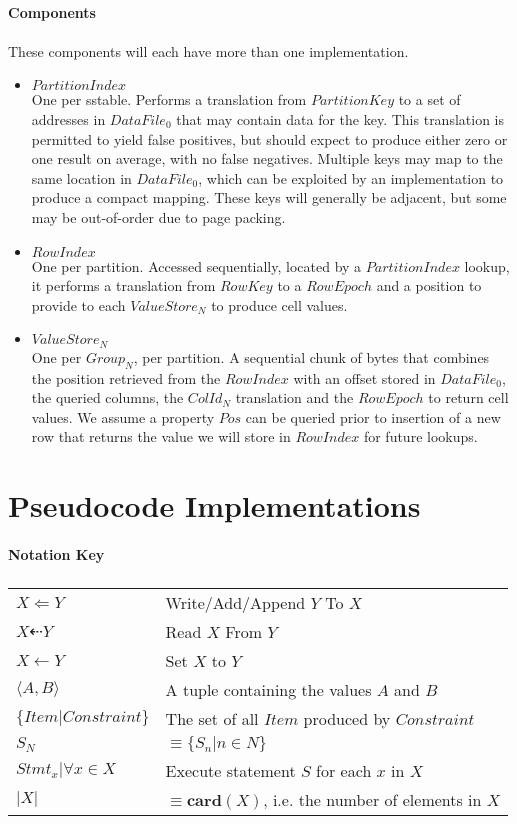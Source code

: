 \documentclass[fleqn]{article}
\begin{document}
\paragraph{Components}
\paragraph{}
These components will each have more than one implementation.
\begin{itemize}
  \item $PartitionIndex$\\[2pt]
    One per sstable.
    Performs a translation from $PartitionKey$ to a set of addresses in $DataFile_0$ that may contain
    data for the key. This translation is permitted to yield false positives, but should
    expect to produce either zero or one result on average, with no false negatives.
    Multiple keys may map to the same location in $DataFile_0$, which can be exploited by an implementation
    to produce a compact mapping. These keys will generally be adjacent, but some may be out-of-order
    due to page packing.
  \item $RowIndex$\\[2pt]
    One per partition. Accessed sequentially, located by a $PartitionIndex$ lookup, it performs 
    a translation from $RowKey$ to a $RowEpoch$ and a position to provide to each $ValueStore_N$
    to produce cell values.
  \item $ValueStore_N$\\[2pt]
    One per $Group_N$, per partition. A sequential chunk of bytes that combines the position retrieved
    from the $RowIndex$ with an offset stored in $DataFile_0$, the queried columns, the $ColId_N$ translation
    and the $RowEpoch$ to return cell values. We assume a property $Pos$ can be queried prior to insertion
    of a new row that returns the value we will store in $RowIndex$ for future lookups.
\end{itemize}

\section{Pseudocode Implementations}
\paragraph{Notation Key}
\subparagraph{}
\begin{tabular}{l l}
$X \Leftarrow Y$ & Write/Add/Append $Y$ To $X$\\
$X \dashleftarrow Y$ & Read $X$ From $Y$\\
$X \gets Y$ & Set $X$ to $Y$\\
$\langle A,B \rangle$ & A tuple containing the values $A$ and $B$\\
$\{Item | Constraint\}$ & The set of all $Item$ produced by $Constraint$\\
$S_N$ & $\equiv \{S_n | n \in N\}$\\
$Stmt_x | \forall x \in X$ & Execute statement $S$ for each $x$ in $X$\\
$\lvert X \rvert$ & $\equiv \mathbf{card}(X)$, i.e. the number of elements in $X$\\
\end{tabular}
\end{document}
